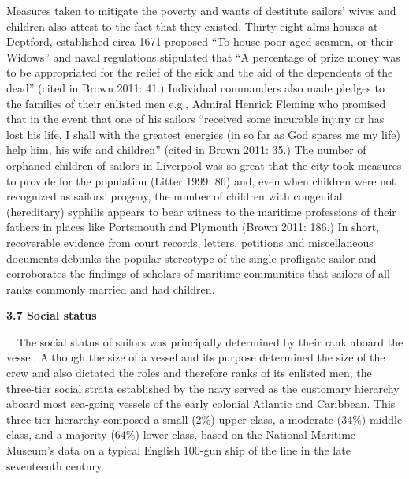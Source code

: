 \begin{styleStandard}
Measures taken to mitigate the poverty and wants of destitute sailors’ wives and children also attest to the fact that they existed. Thirty-eight alms houses at Deptford, established circa 1671 proposed “To house poor aged seamen, or their Widows” and naval regulations stipulated that “A percentage of prize money was to be appropriated for the relief of the sick and the aid of the dependents of the dead” (cited in Brown 2011: 41.) Individual commanders also made pledges to the families of their enlisted men e.g., Admiral Henrick Fleming who promised that in the event that one of his sailors “received some incurable injury or has lost his life, I shall with the greatest energies (in so far as God spares me my life) help him, his wife and children” (cited in Brown 2011: 35.) The number of orphaned children of sailors in Liverpool was so great that the city took measures to provide for the population (Litter 1999: 86) and, even when children were not recognized as sailors’ progeny, the number of children with congenital (hereditary) syphilis appears to bear witness to the maritime professions of their fathers in places like Portsmouth and Plymouth (Brown 2011: 186.) In short, recoverable evidence from court records, letters, petitions and miscellaneous documents debunks the popular stereotype of the single profligate sailor and corroborates the findings of scholars of maritime communities that sailors of all ranks commonly married and had children. 
\end{styleStandard}


\begin{styleStandard}
\textbf{3.7 Social status}
\end{styleStandard}


\begin{styleStandard}
\ \ The social status of sailors was principally determined by their rank aboard the vessel. Although the size of a vessel and its purpose determined the size of the crew and also dictated the roles and therefore ranks of its enlisted men, the three-tier social strata established by the navy served as the customary hierarchy aboard most sea-going vessels of the early colonial Atlantic and Caribbean. This three-tier hierarchy composed a small (2\%) upper class, a moderate (34\%) middle class, and a majority (64\%) lower class, based on the National Maritime Museum’s data on a typical English 100-gun ship of the line in the late seventeenth century. 
\end{styleStandard}


